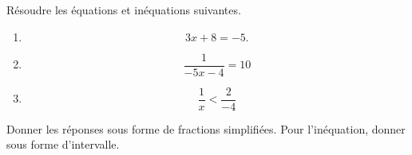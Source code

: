 
\begin{exercice}\label{exosmath-0346}

    Résoudre les équations et inéquations suivantes.
    \begin{enumerate}
        \item
            \begin{equation}
                3x+8=-5.
            \end{equation}
        \item
            \begin{equation}
                \frac{ 1 }{ -5x-4 }=10
            \end{equation}
        \item
            \begin{equation}
                \frac{ 1 }{ x }<\frac{ 2 }{ -4 }
            \end{equation}
    \end{enumerate}
    Donner les réponses sous forme de fractions simplifiées. Pour l'inéquation, donner sous forme d'intervalle.

\end{exercice}
